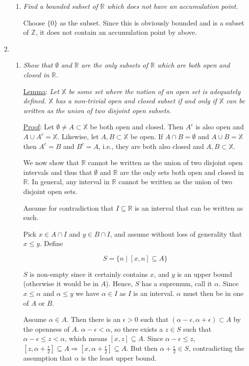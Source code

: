 \documentclass[11pt]{article}
\begin{document}
\begin{enumerate}
\begin{enumerate}
\item \emph{Find a bounded subset of $\mathbb{R}$ which does not have an accumulation point.}

Choose $\{0\}$ as the subset.  Since this is obviously bounded and is a subset of $\mathbb{Z}$, it does not contain an accumulation point by above.
\end{enumerate}

\item
\begin{enumerate}
\item \emph{Show that $\emptyset$ and $\mathbb{R}$ are the only subsets of $\mathbb{R}$ which are both open and closed in $\mathbb{R}$.}

\underline{Lemma}: \emph{Let $\mathbb{X}$ be some set where the notion of an open set is adequately defined.  $\mathbb{X}$ has a non-trivial open and closed subset if and only if $\mathbb{X}$ can be written as the union of two disjoint open subsets.}

\underline{Proof}: Let $\emptyset \neq A \subset \mathbb{X}$ be both open and closed.  Then $A^c$ is also open and $A \cup A^c = \mathbb{X}$.  Likewise, let $A,B \subset \mathbb{X}$ be open.  If $A \cap B = \emptyset$ and $A \cup B = \mathbb{X}$ then $A^c = B$ and $B^c = A$, i.e., they are both also closed and $A,B \subset \mathbb{X}$. 

We now show that $\mathbb{R}$ cannot be written as the union of two disjoint open intervals and thus that $\emptyset$ and $\mathbb{R}$ are the only sets both open and closed in $\mathbb{R}$.  In general, any interval in $\mathbb{R}$ cannot be written as the union of two disjoint open sets.

Assume for contradiction that $I \subseteq \mathbb{R}$ is an interval that can be written as such.

Pick $x \in A \cap I$ and $y \in B \cap I$, and assume without loss of generality that $x \leq y$.  Define

\[ S = \{n \mid [x,n] \subseteq A\}\]

$S$ is non-empty since it certainly contains $x$, and $y$ is an upper bound (otherwise it would be in $A$).  Hence, $S$ has a supremum, call it $\alpha$.  Since $x \leq \alpha$ and $\alpha \leq y$ we have $\alpha \in I$ as $I$ is an interval.  $\alpha$ must then be in one of $A$ or $B$.

Assume $\alpha \in A$.  Then there is an $\epsilon > 0$ such that $(\alpha - \epsilon, \alpha + \epsilon) \subset A$ by the openness of $A$.  $\alpha - \epsilon < \alpha$, so there exists a $z \in S$ such that $\alpha - \epsilon \leq z < \alpha$, which means $[x,z] \subseteq A$.  Since $\alpha - \epsilon \leq z$, $[z,\alpha + \frac{\epsilon}{2}] \subseteq A \Rightarrow [x,\alpha+\frac{\epsilon}{2}] \subseteq A$.  But then $\alpha+\frac{\epsilon}{2} \in S$, contradicting the assumption that $\alpha$ is the least upper bound.


\end{enumerate}
\end{enumerate}
\end{document}
